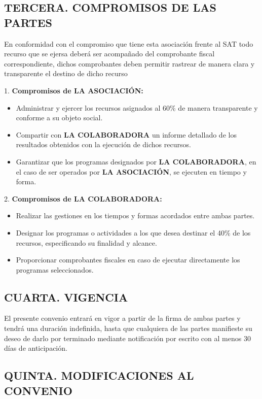\documentclass[a4paper,12pt]{article}
\begin{document}
\subsection*{TERCERA. COMPROMISOS DE LAS PARTES}

En conformidad con el compromiso que tiene esta asociación frente al SAT todo recurso que se ejersa deberá ser acompañado del comprobante fiscal correspondiente, dichos comprobantes deben permitir rastrear de manera clara y transparente el destino de dicho recurso

1. \textbf{Compromisos de LA ASOCIACIÓN:}
    \begin{itemize}
        \item Administrar y ejercer los recursos asignados al 60\% de manera transparente y conforme a su objeto social.
        \item Compartir con \textbf{LA COLABORADORA} un informe detallado de los resultados obtenidos con la ejecución de dichos recursos.
        \item Garantizar que los programas designados por \textbf{LA COLABORADORA}, en el caso de ser operados por \textbf{LA ASOCIACIÓN}, se ejecuten en tiempo y forma.
    \end{itemize}

2. \textbf{Compromisos de LA COLABORADORA:}
    \begin{itemize}
        \item Realizar las gestiones en los tiempos y formas acordados entre ambas partes.
        \item Designar los programas o actividades a los que desea destinar el 40\% de los recursos, especificando su finalidad y alcance.
        \item Proporcionar comprobantes fiscales en caso de ejecutar directamente los programas seleccionados.
    \end{itemize}

\subsection*{CUARTA. VIGENCIA}

El presente convenio entrará en vigor a partir de la firma de ambas partes y tendrá una duración indefinida, hasta que cualquiera de las partes manifieste su deseo de darlo por terminado mediante notificación por escrito con al menos 30 días de anticipación.

\subsection*{QUINTA. MODIFICACIONES AL CONVENIO}
\end{document}
